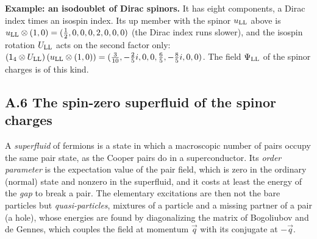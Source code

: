 \documentclass[
  10pt,
]{article}
\begin{document}
\textbf{Example: an isodoublet of Dirac spinors.} It has eight
components, a Dirac index times an isospin index. Its up member with the
spinor \(u_{\rm LL}\) above is
\(u_{\rm LL}\otimes(1,0)=(\tfrac{1}{2},0,0,0,2,0,0,0)\) (the Dirac index
runs slower), and the isospin rotation \(U_{\rm LL}\) acts on the second
factor only:
\((\mathsf 1_4\otimes U_{\rm LL})\,(u_{\rm LL}\otimes(1,0))=(\tfrac{3}{10},-\tfrac{2}{5}i,0,0,\tfrac{6}{5},-\tfrac{8}{5}i,0,0)\).
The field \(\Psi_{\rm LL}\) of the spinor charges is of this kind.

\hypertarget{a.6-the-spin-zero-superfluid-of-the-spinor-charges}{%
\subsection{A.6 The spin-zero superfluid of the spinor
charges}\label{a.6-the-spin-zero-superfluid-of-the-spinor-charges}}

A \emph{superfluid} of fermions is a state in which a macroscopic number
of pairs occupy the same pair state, as the Cooper pairs do in a
superconductor. Its \emph{order parameter} is the expectation value of
the pair field, which is zero in the ordinary (normal) state and nonzero
in the superfluid, and it costs at least the energy of the \emph{gap} to
break a pair. The elementary excitations are then not the bare particles
but \emph{quasi-particles}, mixtures of a particle and a missing partner
of a pair (a hole), whose energies are found by diagonalizing the matrix
of Bogoliubov and de Gennes, which couples the field at momentum
\(\vec q\) with its conjugate at \(-\vec q\).
\end{document}
